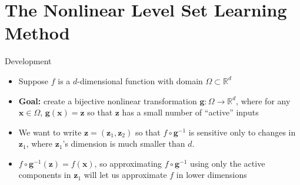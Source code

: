 \documentclass[10pt]{beamer}
\begin{document}
\section{The Nonlinear Level Set Learning Method}
\begin{frame}{Development}
\begin{itemize}\itemsep20pt
    \item Suppose $f$ is a $d$-dimensional function with domain $\Omega \subset \mathbb{R}^d$
    
    \item \textbf{Goal:} create a bijective nonlinear transformation $\bm{g}: \Omega \rightarrow \mathbb{R}^d$, where for any $\bm{x} \in \Omega$, $\bm{g}(\bm{x}) = \bm{z}$ so that $\bm{z}$ has a small number of ``active'' inputs
    
    \item We want to write $\bm{z} = (\bm{z}_1, \bm{z}_2)$ so that $f \circ \bm{g}^{-1}$ is sensitive only to changes in $\bm{z}_1$, where $\bm{z}_1$'s dimension is much smaller than $d$.  
    
    \item $f \circ \bm{g}^{-1}(\bm{z}) = f(\bm{x})$, so approximating $f \circ \bm{g}^{-1}$ using only the active components in $\bm{z}_1$ will let us approximate $f$ in lower dimensions
\end{itemize}
\end{frame}
\end{document}
